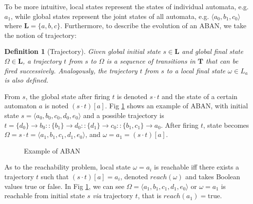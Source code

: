 \documentclass[en]{jdoc}
\newtheorem{definition}{Definition}
\newcommand{\acm}[3]{#1\rightarrow#2}
\begin{document}
To be more intuitive, local states represent the states of individual automata, e.g. $a_1$, while global states represent the joint states of all automata, e.g. $\langle a_0, b_1,c_0 \rangle$ where $\mathbf{L}=\{a,b,c\}$. Furthermore, to describe the evolution of an ABAN, we take the notion of trajectory:
\begin{definition}[Trajectory]
Given global initial state $s\in \mathbf{L}$ and global final state $\Omega\in \mathbf{L}$, a trajectory $t$ from $s$ to $\Omega$ is a sequence of transitions in $\mathbf{T}$ that can be fired successively. Analogously, the trajectory $t$ from $s$ to a local final state $\omega\in L_a$ is also defined.%
\end{definition}

From $s$, the global state after firing $t$ is denoted $s\cdot t$ and the state of a certain automaton $a$ is noted $(s\cdot t)[a]$.
Fig \ref{exampleABAN} shows an example of ABAN, with initial state $s=\langle a_0,b_0,c_0,d_0,e_0\rangle$ and a possible trajectory is $t=\acm{\{d_0\}}{b_0}{b_1}::\acm{\{b_1\}}{d_0}{d_1}::\acm{\{d_1\}}{c_0}{c_1}::\acm{\{b_1,c_1\}}{a_0}{a_1}$. After firing $t$, state becomes $\Omega=s\cdot t=\langle a_1,b_1,c_1,d_1,e_0\rangle$, and $\omega= a_1= (s\cdot t)[a]$.

\begin{figure}[ht]
\centering

\caption{Example of ABAN}\label{exampleABAN}
\end{figure}
As to the reachability problem, local state $\omega=a_i$ is reachable iff there exists a trajectory $t$ such that $(s\cdot t)[a]=a_i$, denoted $reach (\omega)$ and takes Boolean values true or false. In Fig \ref{exampleABAN}, we can see $\Omega=\langle a_1,b_1,c_1,d_1,e_0\rangle$ or $\omega=a_1$ is reachable from initial state $s$ \textit{via} trajectory $t$, that is $reach(a_1)=\text{true}$.
\end{document}
